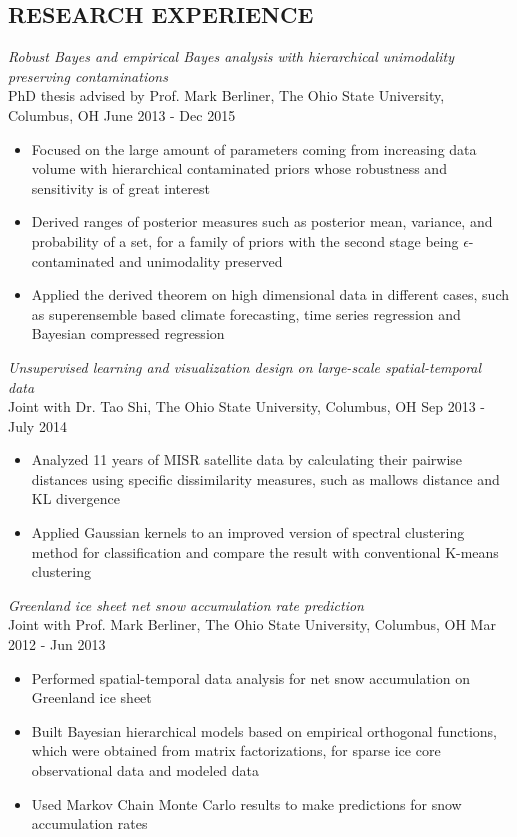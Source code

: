 \documentclass[10pt]{res} %
\begin{document}
\begin{resume}
\section{RESEARCH EXPERIENCE}

\vspace{6pt} %

  {\sl Robust Bayes and empirical Bayes analysis with
     hierarchical unimodality preserving contaminations }\\
PhD thesis advised by Prof. Mark Berliner, The Ohio State University,
Columbus, OH \hfill June 2013 - Dec 2015
 \begin{itemize} \itemsep -2pt  %
    \item Focused on the large amount of parameters coming from
      increasing data volume with hierarchical contaminated priors whose robustness and sensitivity is of great interest
    \item Derived ranges of posterior measures such as posterior mean,
      variance, and probability of a set, for a family of priors with the second stage being $\epsilon$-contaminated and unimodality preserved
    \item Applied the derived theorem on high dimensional data in different cases, such as superensemble based climate forecasting, time series regression and Bayesian compressed regression
\end{itemize}

  {\sl Unsupervised learning and visualization design on
     large-scale spatial-temporal data}\\
Joint with Dr. Tao Shi, The Ohio State University, Columbus, OH
\hfill Sep 2013 - July 2014
 \begin{itemize} \itemsep -2pt  %
\item Analyzed 11 years of MISR satellite data by calculating their pairwise distances using specific dissimilarity
 measures, such as mallows distance and KL divergence
\item Applied Gaussian kernels to an improved version of spectral
  clustering method for classification and compare the result with conventional K-means clustering
\end{itemize}

  {\sl Greenland ice sheet net snow accumulation rate prediction}\\
Joint with Prof. Mark Berliner, The Ohio State University, Columbus, OH \hfill Mar 2012 - Jun 2013
 \begin{itemize} \itemsep -2pt  %
    \item Performed spatial-temporal data analysis for net snow
      accumulation on Greenland ice sheet
    \item Built Bayesian hierarchical models based on empirical
      orthogonal functions, which were obtained from matrix
      factorizations, for sparse ice core observational data and modeled data
    \item Used Markov Chain Monte Carlo results to make predictions for snow accumulation rates 
\end{itemize}


\end{resume}
\end{document}
